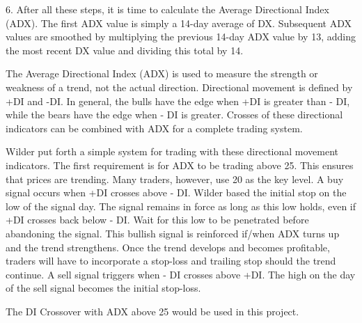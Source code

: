 6. After all these steps, it is time to calculate the Average Directional Index (ADX). The first ADX value is simply a 14-day average of DX. Subsequent ADX values are smoothed by multiplying the previous 14-day ADX value by 13, adding the most recent DX value and dividing this total by 14.

The Average Directional Index (ADX) is used to measure the strength or weakness of a trend, not the actual direction. Directional movement is defined by +DI and -DI. In general, the bulls have the edge when +DI is greater than - DI, while the bears have the edge when - DI is greater. Crosses of these directional indicators can be combined with ADX for a complete trading system.

Wilder put forth a simple system for trading with these directional movement indicators. The first requirement is for ADX to be trading above 25. This ensures that prices are trending. Many traders, however, use 20 as the key level. A buy signal occurs when +DI crosses above - DI. Wilder based the initial stop on the low of the signal day. The signal remains in force as long as this low holds, even if +DI crosses back below - DI. Wait for this low to be penetrated before abandoning the signal. This bullish signal is reinforced if/when ADX turns up and the trend strengthens. Once the trend develops and becomes profitable, traders will have to incorporate a stop-loss and trailing stop should the trend continue. A sell signal triggers when - DI crosses above +DI. The high on the day of the sell signal becomes the initial stop-loss.

The DI Crossover with ADX above 25 would be used in this project.
